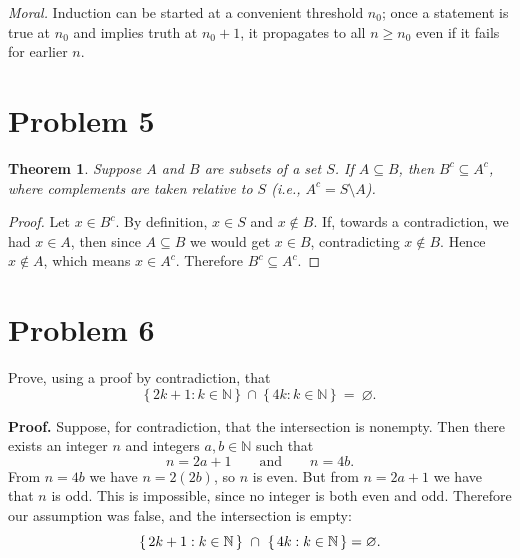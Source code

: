\documentclass[12pt]{article}
\newtheorem{theorem}{Theorem}
\begin{document}
\emph{Moral.} Induction can be started at a convenient threshold $n_{0}$; once a statement
is true at $n_{0}$ and implies truth at $n_{0}+1$, it propagates to all $n\ge n_{0}$ even if it
fails for earlier $n$.


\section*{Problem 5}
\begin{theorem}
Suppose $A$ and $B$ are subsets of a set $S$. If $A \subseteq B$, then $B^{c} \subseteq A^{c}$,
where complements are taken relative to $S$ (i.e., $A^{c}=S\setminus A$).
\end{theorem}

\begin{proof}
Let $x\in B^{c}$. By definition, $x\in S$ and $x\notin B$. If, towards a contradiction,
we had $x\in A$, then since $A\subseteq B$ we would get $x\in B$, contradicting $x\notin B$.
Hence $x\notin A$, which means $x\in A^{c}$. Therefore $B^{c}\subseteq A^{c}$.
\end{proof}

\section*{Problem 6}
Prove, using a proof by contradiction, that
\[
\{\,2k+1 : k\in \mathbb{N}\,\}\ \cap\ \{\,4k : k\in \mathbb{N}\,\}\ =\ \varnothing.
\]

\textbf{Proof.} Suppose, for contradiction, that the intersection is nonempty.
Then there exists an integer \(n\) and integers \(a,b\in\mathbb{N}\) such that
\[
n = 2a+1 \qquad\text{and}\qquad n = 4b.
\]
From \(n=4b\) we have \(n=2(2b)\), so \(n\) is even. But from \(n=2a+1\) we have
that \(n\) is odd. This is impossible, since no integer is both even and odd.
Therefore our assumption was false, and the intersection is empty:
\[
\{\,2k+1 : k\in \mathbb{N}\,\}\ \cap\ \{\,4k : k\in \mathbb{N}\,\} = \varnothing.\qedhere
\]
\end{document}
